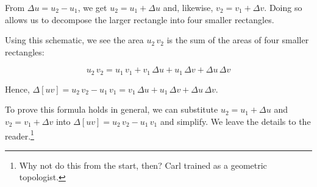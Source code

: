 \documentclass{ximera}
\begin{document}
From $\Delta u = u_{2} - u_{1}$, we get $u_{2} = u_{1} + \Delta u$ and, likewise,  $v_{2} = v_{1} + \Delta v$.  Doing so allows us to decompose the larger rectangle into four smaller rectangles. 

\begin{image}


\end{image}

Using this schematic, we see the area   $u_{2} \, v_{2}$ is the sum of the areas of four smaller rectangles:

\[ u_{2} \, v_{2}  = u_{1} \, v_{1} +  v_{1} \, \Delta u + u_{1} \, \Delta v + \Delta u \, \Delta v \]

Hence, $\Delta[uv]  = u_{2} \, v_{2} - u_{1} \, v_{1}  =  v_{1} \, \Delta u + u_{1} \, \Delta v +  \Delta u \, \Delta v$.

To prove this formula holds in general, we can substitute $u_{2}  = u_{1} + \Delta u$ and $v_{2} = v_{1} + \Delta v$ into  $\Delta[uv] = u_{2} \, v_{2} - u_{1} \, v_{1}$ and simplify.  We leave the details to the reader.\footnote{Why not do this from the start, then?  Carl trained as a geometric topologist.}
\end{document}

